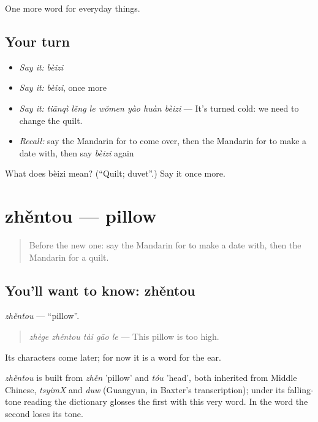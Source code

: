 \begin{grammarlens}[title={What you've built}]
One more word for everyday things.
\end{grammarlens}

\subsection*{Your turn}
\begin{itemize}
\raggedright
  \item \emph{Say it:} \emph{bèizi}
  \item \emph{Say it:} \emph{bèizi}, once more
  \item \emph{Say it:} \emph{tiānqì lěng le wǒmen yào huàn bèizi} — It's turned cold: we need to change the quilt.
  \item \emph{Recall:} say the Mandarin for to come over, then the Mandarin for to make a date with, then say \emph{bèizi} again
\end{itemize}

\begin{tcolorbox}[breakable,colback=teal!4,colframe=teal!35!black,title={Before you move on}]
What does bèizi mean? (\textquotedblleft{}Quilt; duvet\textquotedblright{}.) Say it once more.
\end{tcolorbox}
\section[zhěntou]{zhěntou — pillow}

\label{lesson:ZH-C181-zhentou}



\begin{quote}
Before the new one: say the Mandarin for to make a date with, then the Mandarin for a quilt.
\end{quote}

\subsection*{You'll want to know: zhěntou}
\emph{zhěntou} — \textquotedblleft{}pillow\textquotedblright{}.

\begin{quote}
\emph{zhège zhěntou tài gāo le} — This pillow is too high.
\end{quote}

Its characters come later; for now it is a word for the ear.

\begin{cousinweb}
\emph{zhěntou} is built from \emph{zhěn} 'pillow' and \emph{tóu} 'head', both inherited from Middle Chinese, \emph{tsyimX} and \emph{duw} (Guangyun, in Baxter's transcription); under its falling-tone reading the dictionary glosses the first with this very word. In the word the second loses its tone.
\end{cousinweb}

